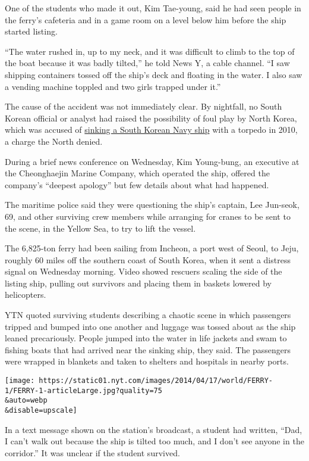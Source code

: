 One of the students who made it out, Kim Tae-young, said he had seen
people in the ferry's cafeteria and in a game room on a level below him
before the ship started listing.

``The water rushed in, up to my neck, and it was difficult to climb to
the top of the boat because it was badly tilted,'' he told News Y, a
cable channel. ``I saw shipping containers tossed off the ship's deck
and floating in the water. I also saw a vending machine toppled and two
girls trapped under it.''

The cause of the accident was not immediately clear. By nightfall, no
South Korean official or analyst had raised the possibility of foul play
by North Korea, which was accused of
\href{http://www.nytimes.com/2010/03/27/world/asia/27korea.html}{sinking
a South Korean Navy ship} with a torpedo in 2010, a charge the North
denied.

During a brief news conference on Wednesday, Kim Young-bung, an
executive at the Cheonghaejin Marine Company, which operated the ship,
offered the company's ``deepest apology'' but few details about what had
happened.

The maritime police said they were questioning the ship's captain, Lee
Jun-seok, 69, and other surviving crew members while arranging for
cranes to be sent to the scene, in the Yellow Sea, to try to lift the
vessel.

The 6,825-ton ferry had been sailing from Incheon, a port west of Seoul,
to Jeju, roughly 60 miles off the southern coast of South Korea, when it
sent a distress signal on Wednesday morning. Video showed rescuers
scaling the side of the listing ship, pulling out survivors and placing
them in baskets lowered by helicopters.

YTN quoted surviving students describing a chaotic scene in which
passengers tripped and bumped into one another and luggage was tossed
about as the ship leaned precariously. People jumped into the water in
life jackets and swam to fishing boats that had arrived near the sinking
ship, they said. The passengers were wrapped in blankets and taken to
shelters and hospitals in nearby ports.

\texttt{[image: https://static01.nyt.com/images/2014/04/17/world/FERRY-1/FERRY-1-articleLarge.jpg?quality=75\\\&auto=webp\\\&disable=upscale]}

In a text message shown on the station's broadcast, a student had
written, ``Dad, I can't walk out because the ship is tilted too much,
and I don't see anyone in the corridor.'' It was unclear if the student
survived.

